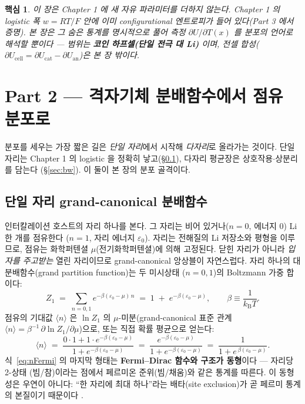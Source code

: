 \documentclass[11pt,a4paper]{article}
\newtheorem*{keybox}{핵심}
\newcommand{\kB}{k_{\mathrm B}}
\newcommand{\avg}[1]{\langle #1\rangle}
\begin{document}
\begin{keybox}
이 장은 Chapter 1 에 \emph{새 자유 파라미터를 더하지 않는다}. Chapter 1 의 logistic 폭 $w=RT/F$ 안에
이미 configurational 엔트로피가 들어 있다(Part 3 에서 증명). 본 장은 그 숨은 통계를 \emph{명시적으로 풀어}
측정 $\partial U/\partial T(x)$ 를 분포의 언어로 해석할 뿐이다 — 범위는 \textbf{코인 하프셀(단일 전극 대 Li)}
이며, 전셀 합성($\partial U_\mathrm{cell}=\partial U_\mathrm{cat}-\partial U_\mathrm{an}$)은 본 장 밖이다.
\end{keybox}

\section*{Part 2 — 격자기체 분배함수에서 점유 분포로}

분포를 세우는 가장 짧은 길은 \emph{단일 자리}에서 시작해 \emph{다자리}로 올라가는 것이다. 단일 자리는
Chapter 1 의 logistic 을 정확히 낳고(\S\ref{sec:single}), 다자리 평균장은 상호작용$\cdot$상분리를 담는다
(\S\ref{sec:bw}). 이 둘이 본 장의 분포 골격이다.

\subsection{단일 자리 grand-canonical 분배함수}\label{sec:single}
인터칼레이션 호스트의 자리 하나를 본다. 그 자리는 비어 있거나($n=0$, 에너지 $0$) Li 한 개를 점유한다
($n=1$, 자리 에너지 $\varepsilon_0$). 자리는 전해질의 Li 저장소와 평형을 이루므로, 점유는 화학퍼텐셜
$\mu$(전기화학퍼텐셜)에 의해 고정된다. 닫힌 자리가 아니라 \emph{입자를 주고받는} 열린 자리이므로
grand-canonical 앙상블이 자연스럽다. 자리 하나의 대분배함수(grand partition function)는 두 미시상태
($n=0,1$)의 Boltzmann 가중 합이다:
\begin{equation}
Z_1 \;=\; \sum_{n=0,1} e^{-\beta(\varepsilon_0-\mu)\,n}
       \;=\; 1 \;+\; e^{-\beta(\varepsilon_0-\mu)},
\qquad \beta\equiv\frac{1}{\kB T}.
\label{eq:Z1}
\end{equation}
점유의 기대값 $\avg n$ 은 $\ln Z_1$ 의 $\mu$-미분(grand-canonical 표준 관계
$\avg n=\beta^{-1}\,\partial\ln Z_1/\partial\mu$)으로, 또는 직접 확률 평균으로 얻는다:
\begin{equation}
\avg n \;=\; \frac{0\cdot1 + 1\cdot e^{-\beta(\varepsilon_0-\mu)}}{1+e^{-\beta(\varepsilon_0-\mu)}}
       \;=\; \frac{e^{-\beta(\varepsilon_0-\mu)}}{1+e^{-\beta(\varepsilon_0-\mu)}}
       \;=\; \frac{1}{1+e^{\,\beta(\varepsilon_0-\mu)}}.
\label{eq:nFermi}
\end{equation}
식~\eqref{eq:nFermi} 의 마지막 형태는 \textbf{Fermi--Dirac 함수와 구조가 동형}이다 — 자리당 2-상태
(빔/참)이라는 점에서 페르미온 준위(빔/채움)와 같은 통계를 따른다. 이 동형성은 우연이 아니다: ``한 자리에
최대 하나''라는 배타(site exclusion)가 곧 페르미 통계의 본질이기 때문이다 \cite{pathria,bazant2013}.
\end{document}

